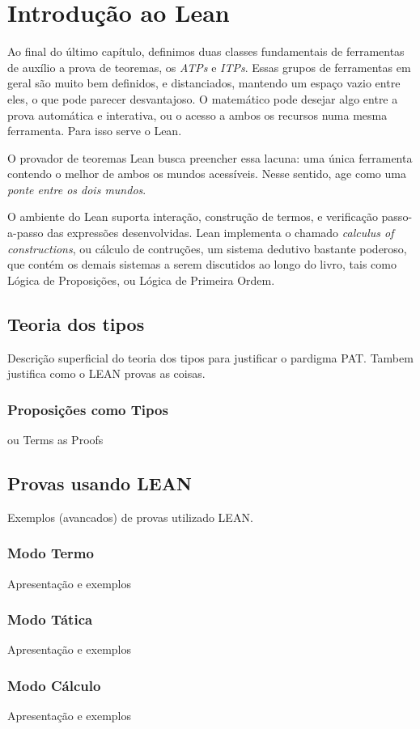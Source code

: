 \chapter{Introdução ao Lean}
Ao final do último capítulo, definimos duas classes fundamentais de ferramentas de auxílio a prova de teoremas, os \textit{ATPs} e \textit{ITPs}.
Essas grupos de ferramentas em geral são muito bem definidos, e distanciados, mantendo um espaço vazio entre eles, o que pode parecer desvantajoso.
O matemático pode desejar algo entre a prova automática e interativa, ou o acesso a ambos os recursos numa mesma ferramenta.
Para isso serve o Lean.

O provador de teoremas Lean busca preencher essa lacuna: uma única ferramenta contendo o melhor de ambos os mundos acessíveis.
Nesse sentido, age como uma \textit{ponte entre os dois mundos}.

O ambiente do Lean suporta interação, construção de termos, e verificação passo-a-passo das expressões desenvolvidas.
Lean implementa o chamado \textit{calculus of constructions}, ou cálculo de contruções, um sistema dedutivo bastante poderoso, que contém os demais sistemas a serem discutidos ao longo do livro, tais como Lógica de Proposições, ou Lógica de Primeira Ordem.

\section{Teoria dos tipos}
Descrição superficial do teoria dos tipos para justificar o pardigma PAT.
Tambem justifica como o LEAN provas as coisas.

\subsection{Proposições como Tipos}
ou Terms as Proofs

\section{Provas usando LEAN}
Exemplos (avancados) de provas utilizado LEAN.

\subsection{Modo Termo}
Apresentação e exemplos

\subsection{Modo Tática}
Apresentação e exemplos

\subsection{Modo Cálculo}
Apresentação e exemplos

